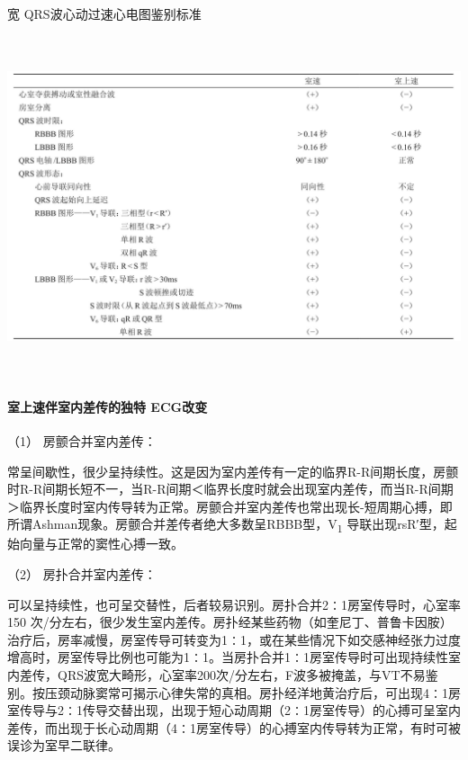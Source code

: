 \begin{table}[htbp]
\centering
\caption{宽 QRS波心动过速心电图鉴别标准}
\label{tab102-17}
\includegraphics[width=6.65625in,height=3.94792in]{./images/Image00455.jpg}
\end{table}


\paragraph{室上速伴室内差传的独特 ECG改变}

\hypertarget{text00295.htmlux5cux23CHP10-2-8-2-2-5-1}{}
（1） 房颤合并室内差传：

常呈间歇性，很少呈持续性。这是因为室内差传有一定的临界R-R间期长度，房颤时R-R间期长短不一，当R-R间期＜临界长度时就会出现室内差传，而当R-R间期＞临界长度时室内传导转为正常。房颤合并室内差传也常出现长-短周期心搏，即所谓Ashman现象。房颤合并差传者绝大多数呈RBBB型，V\textsubscript{1}
导联出现rsR′型，起始向量与正常的窦性心搏一致。

\hypertarget{text00295.htmlux5cux23CHP10-2-8-2-2-5-2}{}
（2） 房扑合并室内差传：

可以呈持续性，也可呈交替性，后者较易识别。房扑合并2∶1房室传导时，心室率150
次/分左右，很少发生室内差传。房扑经某些药物（如奎尼丁、普鲁卡因胺）治疗后，房率减慢，房室传导可转变为1∶1，或在某些情况下如交感神经张力过度增高时，房室传导比例也可能为1∶1。当房扑合并1∶1房室传导时可出现持续性室内差传，QRS波宽大畸形，心室率200次/分左右，F波多被掩盖，与VT不易鉴别。按压颈动脉窦常可揭示心律失常的真相。房扑经洋地黄治疗后，可出现4∶1房室传导与2∶1传导交替出现，出现于短心动周期（2∶1房室传导）的心搏可呈室内差传，而出现于长心动周期（4∶1房室传导）的心搏室内传导转为正常，有时可被误诊为室早二联律。

